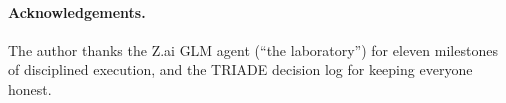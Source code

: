 \documentclass[11pt,a4paper]{article}
\begin{document}
\paragraph{Acknowledgements.} The author thanks the Z.ai GLM agent
(``the laboratory'') for eleven milestones of disciplined execution, and
the TRIADE decision log for keeping everyone honest.


\end{document}
